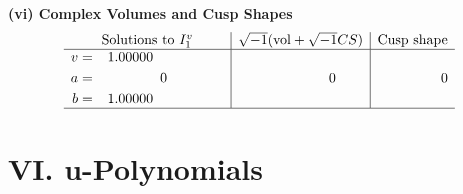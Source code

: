 \documentclass[1p]{elsarticle_modified}
\theoremstyle{definition}
\newcommand{\I}{\sqrt{-1}}
\begin{document}
\newpage\flushleft \textbf{(vi) Complex Volumes and Cusp Shapes}
$$\begin{array}{c|c|c}  
\text{Solutions to }I^v_{1}& \I (\text{vol} + \sqrt{-1}CS) & \text{Cusp shape}\\
 \hline 
\begin{aligned}
v &= \phantom{-}1.00000\phantom{ +0.000000I} \\
a &= \phantom{-0.000000 } 0 \\
b &= \phantom{-}1.00000\phantom{ +0.000000I}\end{aligned}
 & \phantom{-0.000000 } 0 & \phantom{-0.000000 } 0\\
 \hline 
 \end{array}$$\newpage
\newpage\renewcommand{\arraystretch}{1}
\centering \section*{ VI. u-Polynomials}
\end{document}

